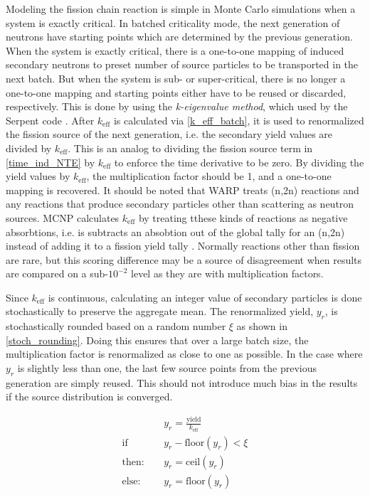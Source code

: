 Modeling the fission chain reaction is simple in Monte Carlo simulations when a system is exactly critical.  In batched criticality mode, the next generation of neutrons have starting points which are determined by the previous generation.  When the system is exactly critical, there is a one-to-one mapping of induced secondary neutrons to preset number of source particles to be transported in the next batch.  But when the system is sub- or super-critical, there is no longer a one-to-one mapping and starting points either have to be reused or discarded, respectively.  This is done by using the \emph{k-eigenvalue method}, which used by the Serpent code \cite{jaakko}.  After $k_\mathrm{eff}$ is calculated via \eqref{k_eff_batch}, it is used to renormalized the fission source of the next generation, i.e. the secondary yield values are divided by $k_\mathrm{eff}$.  This is an analog to dividing the fission source term in \eqref{time_ind_NTE} by $k_\mathrm{eff}$ to enforce the time derivative to be zero.  By dividing the yield values by $k_\mathrm{eff}$, the multiplication factor should be 1, and a one-to-one mapping is recovered.  It should be noted that WARP treats (n,2n) reactions and any reactions that produce secondary particles other than scattering as neutron sources.  MCNP calculates $k_\mathrm{eff}$ by treating tthese kinds of reactions as negative absorbtions, i.e. is subtracts an absobtion out of the global tally for an (n,2n) instead of adding it to a fission yield tally \cite{mcnp}.  Normally reactions other than fission are rare, but this scoring difference may be a source of disagreement when results are compared on a sub-$10^{-2}$ level as they are with multiplication factors.

Since $k_\mathrm{eff}$ is continuous, calculating an integer value of secondary particles is done stochastically to preserve the aggregate mean.  The renormalized yield, $y_r$, is stochastically rounded based on a random number $\xi$ as shown in  \eqref{stoch_rounding}.  Doing this ensures that over a large batch size, the multiplication factor is renormalized as close to one as possible.  In the case where $y_r$ is slightly less than one, the last few source points from the previous generation are simply reused.  This should not introduce much bias in the results if the source distribution is converged.

\begin{equation}
\label{stoch_rounding}
\begin{split}
&y_r = \frac{\mathrm{yield}}{k_\mathrm{eff}} \\
\mathrm{if}\quad &y_r - \mathrm{floor}(y_r)<\xi \\
\mathrm{then:}\quad &y_r=\mathrm{ceil}(y_r) \\
\mathrm{else:}\quad &y_r=\mathrm{floor}(y_r)
\end{split}
\end{equation}

